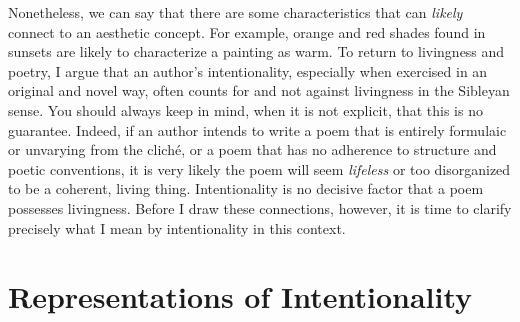 Nonetheless, we can say that there are some characteristics that can
\emph{likely} connect to an aesthetic concept. For example, orange and
red shades found in sunsets are likely to characterize a painting as
warm. To return to livingness and poetry, I argue that an
author's intentionality, especially when exercised in an original and
novel way, often counts for and not against livingness in the Sibleyan
sense. You should always keep in mind, when it is not explicit, that
this is no guarantee. Indeed, if an author intends to write a poem that
is entirely formulaic or unvarying from the cliché, or a poem that has
no adherence to structure and poetic conventions, it is very likely the
poem will seem \emph{lifeless} or too disorganized to be a coherent,
living thing. Intentionality is no decisive factor that a poem possesses
livingness. Before I draw these connections, however, it is time to
clarify precisely what I mean by intentionality in this context.

\section{Representations of Intentionality}

